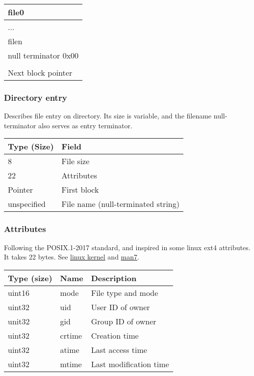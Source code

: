 \documentclass[]{article}
\begin{document}
	\begin{tabular}{|l|}
		\hline
		file0 \\
		\hline
		... \\
		\hline
		filen \\
		\hline
		null terminator 0x00 \\
		\hline
		[Padding] \\
		\hline
		Next block pointer \\
		\hline
	\end{tabular}

	\subsubsection{Directory entry}
	Describes file entry on directory. Its size is variable, and the filename null-terminator also serves as entry terminator. \\

	\begin{tabular}{|l|l|}
		\hline
		\textbf{Type (Size)} & \textbf{Field} \\ [0.5ex]
		\hline
		8 & File size \\
		\hline
		22 & Attributes \\
		\hline
		Pointer & First block \\
		\hline
		unspecified & File name (null-terminated string) \\
		\hline
	\end{tabular}

	\subsubsection{Attributes}
	Following the POSIX.1-2017 standard, and inspired in some linux ext4 attributes. It takes 22 bytes.
	See \href{https://ext4.wiki.kernel.org/index.php/Ext4\_Disk\_Layout\#Inode\_Table}{linux kernel} and \href{https://man7.org/linux/man-pages/man3/stat.3type.html}{man7}. \\

	\begin{tabular}{|l|l|l|}
		\hline
		\textbf{Type (size)} & \textbf{Name} & \textbf{Description} \\ [0.5ex]
		\hline
		uint16 & mode & File type and mode \\
		\hline
		uint32 & uid & User ID of owner \\
		\hline
		unit32 & gid & Group ID of owner \\
		\hline
		uint32 & crtime & Creation time \\
		\hline
		uint32 & atime & Last access time \\
		\hline
		uint32 & mtime & Last modification time \\
		\hline
	\end{tabular}
\end{document}
